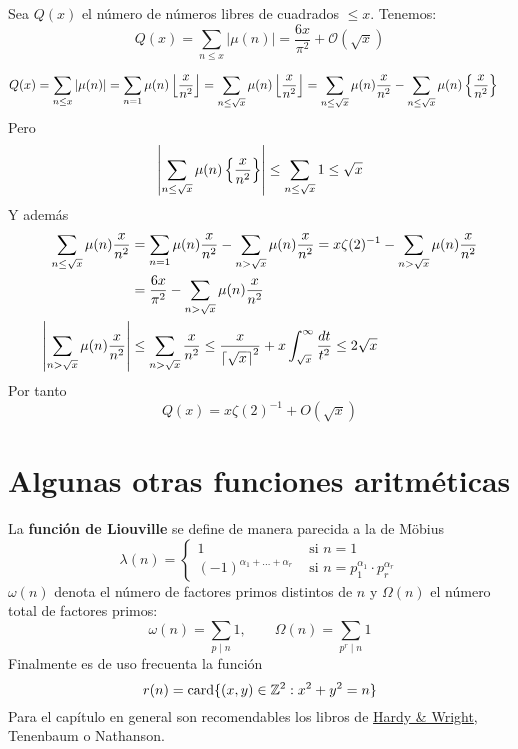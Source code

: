 \documentclass[TAN.tex]{subfiles}
\begin{document}
\begin{teorema}
Sea $Q(x)$ el número de números libres de cuadrados $≤x$. Tenemos:
\[ Q(x) = \sum_{n≤x} |μ(n)| = \frac{6x}{π^2} + \mathcal{O}(\sqrt{x}) \]
\end{teorema}
\begin{dem}
\begin{align*}
Q(x)&=\sum_{n\leq x}\left|\mu(n)\right| = \sum_{n=1}\mu(n)\left\lfloor{\frac{x}{n^2}}\right\rfloor = \sum_{n\leq \sqrt{x}}\mu(n)\left\lfloor{\frac{x}{n^2}}\right\rfloor = \sum_{n\leq \sqrt{x}}\mu(n){\frac{x}{n^2}}  - \sum_{n\leq \sqrt{x}}\mu(n)\left\{{\frac{x}{n^2}}\right\} 
\end{align*}
Pero 
$$
\left|\sum_{n\leq \sqrt{x}}\mu(n)\left\{{\frac{x}{n^2}}\right\}  \right|\leq \sum_{n\leq \sqrt{x}}1 \leq \sqrt{x}
$$
Y además
\begin{align*}
\sum_{n\leq \sqrt{x}}\mu(n){\frac{x}{n^2}}  &= \sum_{n=1}\mu(n){\frac{x}{n^2}}  - \sum_{n>\sqrt{x}}\mu(n){\frac{x}{n^2}} = x\zeta(2)^{-1} - \sum_{n>\sqrt{x}}\mu(n){\frac{x}{n^2}}\\
&=\frac{6x}{\pi^2} - \sum_{n>\sqrt{x}}\mu(n){\frac{x}{n^2}}\\
\left|\sum_{n>\sqrt{x}}\mu(n){\frac{x}{n^2}}\right|&\leq \sum_{n>\sqrt{x}}{\frac{x}{n^2}} \leq \frac{x}{\left\lceil{\sqrt{x}}\right\rceil^2}+x\int_{\sqrt{x}}^\infty \frac{dt}{t^2} \leq 2\sqrt{x}
\end{align*}
Por tanto
$$
Q(x) = x\zeta(2)^{-1} + O(\sqrt{x}) 
$$
\end{dem}
\section{Algunas otras funciones aritméticas}
La \textbf{función de Liouville} se define de manera parecida a la de Möbius
\[ λ(n) = \begin{cases}
	1 &\text{ si }n=1\\
	(-1)^{α_1+\dots+α_r} &\text{ si }n=p_1^{α_1}\cdot p_r^{α_r}
\end{cases} \]
$ω(n)$ denota el número de factores primos distintos de $n$ y $Ω(n)$ el número total de factores primos:
\[ ω(n) = \sum_{p\mid n} 1, \qquad Ω(n) = \sum_{p^r\mid n} 1 \]
Finalmente es de uso frecuenta la función
\[ r(n) = \text{card}\{(x,y) \in \mathbb{Z}^2 : x^2+y^2=n\} \]
Para el capítulo en general son recomendables los libros de \href{https://leonettipaolo.files.wordpress.com/2012/07/ebook-english-g-h-hardy-an-introduction-to-the-theory-of-numbers.pdf}{Hardy \& Wright}, Tenenbaum o Nathanson.
\end{document}
